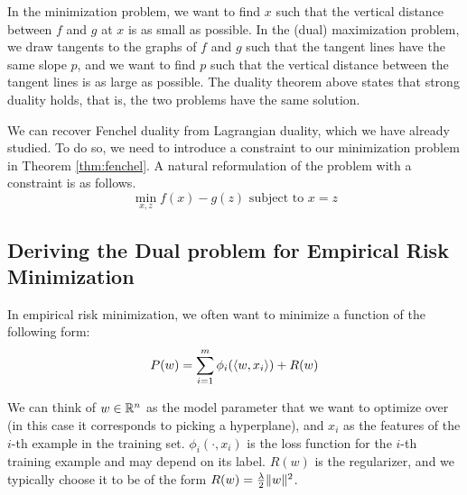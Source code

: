 In the minimization problem, we want to find $x$ such that the vertical distance between $f$ and $g$ at $x$ is as small as possible. In the (dual) maximization problem, we draw tangents to the graphs of $f$ and $g$ such that the tangent lines have the same slope $p$, and we want to find $p$ such that the vertical distance between the tangent lines is as large as possible. The duality theorem above states that strong duality holds, that is, the two problems have the same solution.

We can recover Fenchel duality from Lagrangian duality, which we have already studied. To do so, we need to introduce a constraint to our minimization problem in Theorem \ref{thm:fenchel}. A natural reformulation of the problem with a constraint is as follows.
\begin{equation}
    \min_{x,z} f(x)-g(z) \text{ subject to } x=z
\end{equation}



\subsection{Deriving the Dual problem for Empirical Risk Minimization}
In empirical risk minimization, we often want to minimize a function of the following form:
\begin{equation}
    P(w) = \sum_{i=1}^m \phi_i(\langle w,x_i\rangle) + R(w)
\end{equation}

We can think of $w \in \mathbb{R}^n$ as the model parameter that we want to optimize over (in this case it corresponds to picking a hyperplane), and $x_i$ as the features of the $i$-th example in the training set. $\phi_i(\cdot, x_i)$ is the loss function for the $i$-th training example and may depend on its label. $R(w)$ is the regularizer, and we typically choose it to be of the form $R(w) = \frac{\lambda}{2}\lVert w\rVert^2$.


